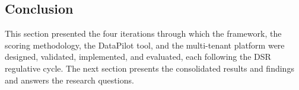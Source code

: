 \subsection{Conclusion}

This section presented the four iterations through which the framework, the scoring methodology, the DataPilot tool, and the multi-tenant platform were designed, validated, implemented, and evaluated, each following the DSR regulative cycle. The next section presents the consolidated results and findings and answers the research questions.
